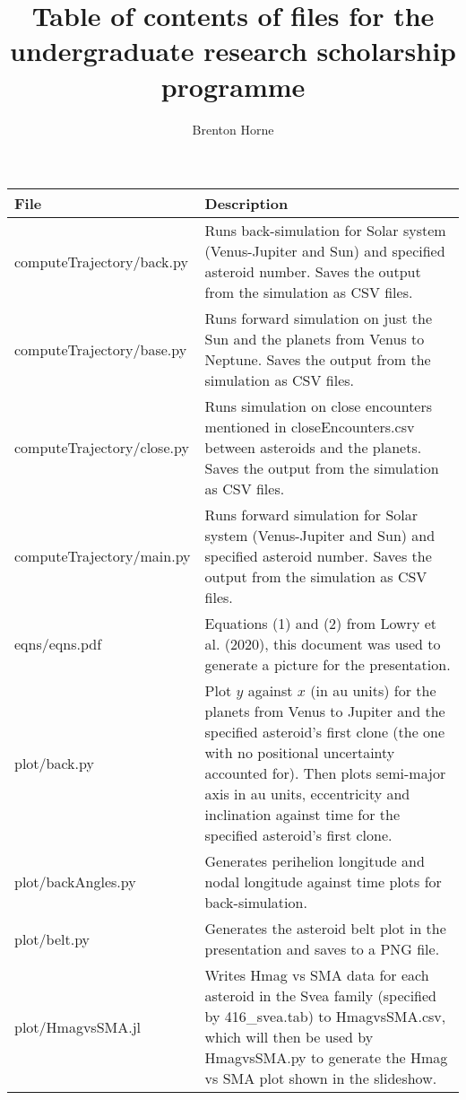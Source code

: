 \documentclass[12pt,a4paper]{article}
\title{Table of contents of files for the undergraduate research scholarship programme}
\author{Brenton Horne}
\begin{document}
\maketitle

\begin{tabular}{|m{15em}|m{30em}|}
    \hline
    File & Description \\\hline
    computeTrajectory/back.py & Runs back-simulation for Solar system (Venus-Jupiter and Sun) and specified asteroid number. Saves the output from the simulation as CSV files.\\\hline
    computeTrajectory/base.py & Runs forward simulation on just the Sun and the planets from Venus to Neptune. Saves the output from the simulation as CSV files.\\\hline
    computeTrajectory/close.py & Runs simulation on close encounters mentioned in closeEncounters.csv between asteroids and the planets. Saves the output from the simulation as CSV files.\\\hline
    computeTrajectory/main.py & Runs forward simulation for Solar system (Venus-Jupiter and Sun) and specified asteroid number. Saves the output from the simulation as CSV files.\\\hline
    eqns/eqns.pdf & Equations (1) and (2) from Lowry et al. (2020), this document was used to generate a picture for the presentation. \\\hline
    plot/back.py & Plot $y$ against $x$ (in au units) for the planets from Venus to Jupiter and the specified asteroid's first clone (the one with no positional uncertainty accounted for). Then plots semi-major axis in au units, eccentricity and inclination against time for the specified asteroid's first clone. \\\hline
    plot/backAngles.py & Generates perihelion longitude and nodal longitude against time plots for back-simulation. \\\hline
    plot/belt.py & Generates the asteroid belt plot in the presentation and saves to a PNG file. \\\hline
    plot/HmagvsSMA.jl & Writes Hmag vs SMA data for each asteroid in the Svea family (specified by 416\_svea.tab) to HmagvsSMA.csv, which will then be used by HmagvsSMA.py to generate the Hmag vs SMA plot shown in the slideshow. \\\hline
    \end{tabular}
\end{document}
